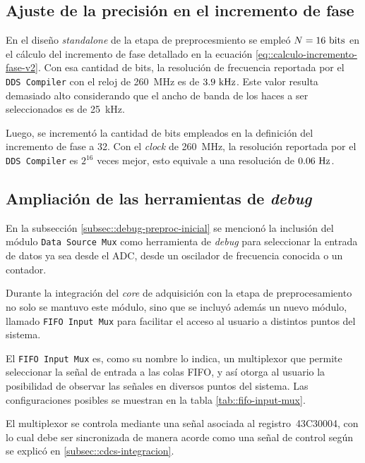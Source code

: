 \documentclass[../../main.tex]{subfiles}
\begin{document}
\subsection{Ajuste de la precisión en el incremento de fase}
En el diseño \textit{standalone} de la etapa de preprocesmiento se empleó $N = 16~\textrm{bits}$ en el cálculo del incremento de fase detallado en la ecuación \ref{eq::calculo-incremento-fase-v2}. Con esa cantidad de bits, la resolución de frecuencia reportada por el \texttt{DDS Compiler} con el reloj de 260~MHz es de $3.9~\textrm{kHz}$. Este valor resulta demasiado alto considerando que el ancho de banda de los haces a ser seleccionados es de 25~kHz.

Luego, se incrementó la cantidad de bits empleados en la definición del incremento de fase a 32. Con el \textit{clock} de 260~MHz, la resolución reportada por el \texttt{DDS Compiler} es $2^{16}$ veces mejor, esto equivale a una resolución de $0.06~\textrm{Hz}$.

\subsection{Ampliación de las herramientas de \textit{debug}}
En la subsección \ref{subsec::debug-preproc-inicial} se mencionó la inclusión del módulo \texttt{Data Source Mux} como herramienta de \textit{debug} para seleccionar la entrada de datos ya sea desde el ADC, desde un oscilador de frecuencia conocida o un contador.

Durante la integración del \textit{core} de adquisición con la etapa de preprocesamiento no solo se mantuvo este módulo, sino que se incluyó además un nuevo módulo, llamado \texttt{FIFO Input Mux} para facilitar el acceso al usuario a distintos puntos del sistema.

El \texttt{FIFO Input Mux} es, como su nombre lo indica, un multiplexor que permite seleccionar la señal de entrada a las colas FIFO, y así otorga al usuario la posibilidad de observar las señales en diversos puntos del sistema. Las configuraciones posibles se muestran en la tabla \ref{tab::fifo-input-mux}.

El multiplexor se controla mediante una señal asociada al registro~43C30004, con lo cual debe ser sincronizada de manera acorde como una señal de control según se explicó en \ref{subsec::cdcs-integracion}.
\end{document}
